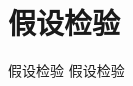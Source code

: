 \section{假设检验}
    
    \frame{\sectionpage}
    
    \begin{frame}{假设检验}
    	假设检验
    \end{frame}
    